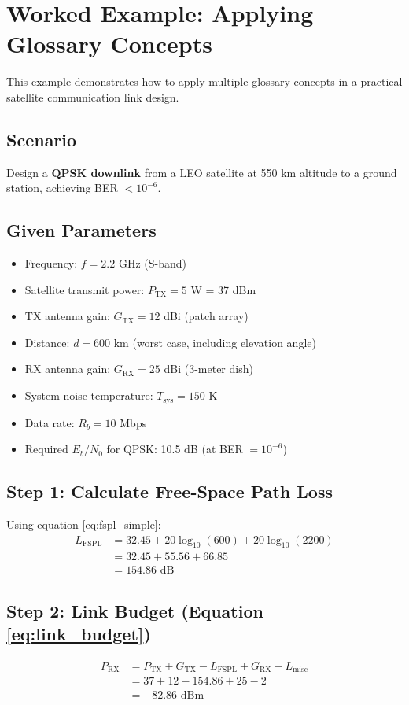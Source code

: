 \section{Worked Example: Applying Glossary Concepts}

This example demonstrates how to apply multiple glossary concepts in a practical satellite communication link design.

\subsection*{Scenario}
Design a \textbf{QPSK downlink} from a LEO satellite at 550 km altitude to a ground station, achieving BER $< 10^{-6}$.

\subsection*{Given Parameters}
\begin{itemize}
\item Frequency: $f = 2.2$ GHz (S-band)
\item Satellite transmit power: $P_{\text{TX}} = 5$ W = 37 dBm
\item TX antenna gain: $G_{\text{TX}} = 12$ dBi (patch array)
\item Distance: $d = 600$ km (worst case, including elevation angle)
\item RX antenna gain: $G_{\text{RX}} = 25$ dBi (3-meter dish)
\item System noise temperature: $T_{\text{sys}} = 150$ K
\item Data rate: $R_b = 10$ Mbps
\item Required $E_b/N_0$ for QPSK: 10.5 dB (at BER $= 10^{-6}$)
\end{itemize}

\subsection*{Step 1: Calculate Free-Space Path Loss}
Using equation \eqref{eq:fspl_simple}:
\begin{align}
L_{\text{FSPL}} &= 32.45 + 20\log_{10}(600) + 20\log_{10}(2200) \nonumber\\
&= 32.45 + 55.56 + 66.85 \nonumber\\
&= 154.86 \text{ dB}
\end{align}

\subsection*{Step 2: Link Budget (Equation \eqref{eq:link_budget})}
\begin{align}
P_{\text{RX}} &= P_{\text{TX}} + G_{\text{TX}} - L_{\text{FSPL}} + G_{\text{RX}} - L_{\text{misc}} \nonumber\\
&= 37 + 12 - 154.86 + 25 - 2 \nonumber\\
&= -82.86 \text{ dBm}
\end{align}

